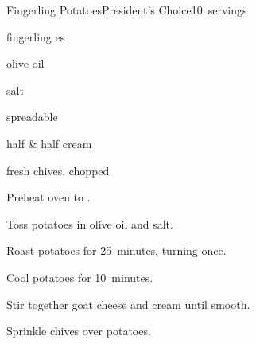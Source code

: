 \begin{recipe}{Fingerling Potatoes}{President's Choice}{10~servings}

\begin{ingredients}
\item {} fingerling es
\item {} olive oil
\item \tp{\half} salt
\item {} spreadable 
\item {} half \& half cream
\item {} fresh chives, chopped
\end{ingredients}

\begin{directions}
\item Preheat oven to .
\item Toss potatoes in olive oil and salt.
\item Roast potatoes for 25~minutes, turning once.
\item Cool potatoes for 10~minutes.
\item Stir together goat cheese and cream until smooth.
\item Sprinkle chives over potatoes.
\end{directions}

\end{recipe}
